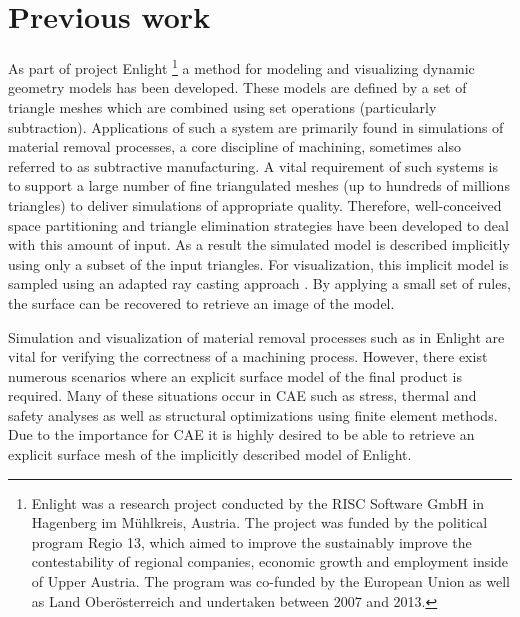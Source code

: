 
\section{Previous work}

As part of project Enlight
\footnote{
	Enlight was a research project conducted by the RISC Software GmbH in Hagenberg im M\"uhlkreis, Austria. The project was funded by the political program Regio 13, which aimed to improve the sustainably improve the contestability of regional companies, economic growth and employment inside of Upper Austria. The program was co-funded by the European Union as well as Land Ober\"osterreich and undertaken between 2007 and 2013.
}
a method for modeling and visualizing dynamic geometry models has been developed. These models are defined by a set of triangle meshes which are combined using set operations (particularly subtraction). Applications of such a system are primarily found in simulations of material removal processes, a core discipline of machining, sometimes also referred to as subtractive manufacturing. A vital requirement of such systems is to support a large number of fine triangulated meshes (up to hundreds of millions triangles) to deliver simulations of appropriate quality. Therefore, well-conceived space partitioning and triangle elimination strategies have been developed to deal with this amount of input. As a result the simulated model is described implicitly using only a subset of the input triangles. For visualization, this implicit model is sampled using an adapted ray casting approach \cite{enlight}. By applying a small set of rules, the surface can be recovered to retrieve an image of the model.

Simulation and visualization of material removal processes such as in Enlight are vital for verifying the correctness of a machining process. However, there exist numerous scenarios where an explicit surface model of the final product is required. Many of these situations occur in CAE such as stress, thermal and safety analyses as well as structural optimizations using finite element methods.
Due to the importance for CAE it is highly desired to be able to retrieve an explicit surface mesh of the implicitly described model of Enlight.